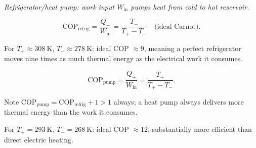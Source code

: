 \begin{center}
\\[3pt]
{\small\itshape Refrigerator/heat pump: work input $W_\text{in}$ pumps heat from cold to hot reservoir.}
\end{center}

\begin{definition}
\[
    \text{COP}_\text{refrig} = \frac{Q_-}{W_\text{in}} = \frac{T_-}{T_+ - T_-} \quad \text{(ideal Carnot)}.
\]
\end{definition}

\begin{example}
For $T_+ \approx 308\ \text{K}$, $T_- \approx 278\ \text{K}$: ideal COP $\approx 9$, meaning a perfect refrigerator moves nine times as much thermal energy as the electrical work it consumes.
\end{example}

\begin{definition}
\[
    \text{COP}_\text{pump} = \frac{Q_+}{W_\text{in}} = \frac{T_+}{T_+ - T_-}.
\]
\end{definition}

Note $\text{COP}_\text{pump} = \text{COP}_\text{refrig} + 1 > 1$ always; a heat pump always delivers more thermal energy than the work it consumes.

\begin{example}
For $T_+ = 293\ \text{K}$, $T_- = 268\ \text{K}$: ideal COP $\approx 12$, substantially more efficient than direct electric heating.
\end{example}

